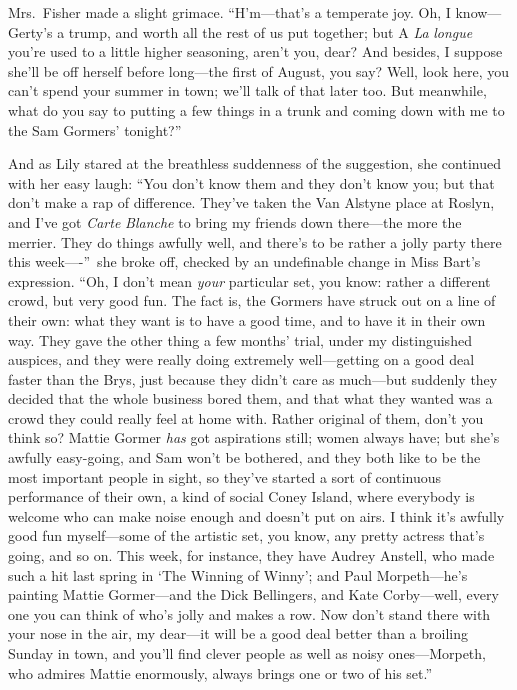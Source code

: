 \documentclass[12pt,a4paper]{book}
\begin{document}
Mrs.\ Fisher made a slight grimace. ``H'm---that's a temperate joy. 
Oh, I know---Gerty's a trump, and worth all the rest of us put
together; but A \textit{La} \textit{longue} you're used to a little higher
seasoning, aren't you, dear? And besides, I suppose she'll be off
herself before long---the first of August, you say? Well,
look here, you can't spend your summer in town; we'll talk of
that later too. But meanwhile, what do you say to putting a few
things in a trunk and coming down with me to the Sam Gormers'
tonight?''





And as Lily stared at the breathless suddenness of the
suggestion, she continued with her easy laugh: ``You don't know
them and they don't know you; but that don't make a rap of
difference. They've taken the Van Alstyne place at Roslyn, and
I've got \textit{Carte} \textit{Blanche} to bring my friends down there---the more
the merrier. They do things awfully well, and there's to be
rather a jolly party there this week----''\ she broke off, checked
by an undefinable change in Miss Bart's expression. ``Oh, I don't
mean \textit{your} particular set, you know: rather a different crowd, but
very good fun. The fact is, the Gormers have struck out on a line
of their own: what they want is to have a good time, and to have
it in their own way. They gave the other thing a few months'
trial, under my distinguished auspices, and they were really
doing extremely well---getting on a good deal faster than the
Brys, just because they didn't care as much---but suddenly they
decided that the whole business bored them, and that what they
wanted was a crowd they could really feel at home with. Rather
original of them, don't you think so? Mattie Gormer \textit{has} got
aspirations still; women always have; but she's awfully
easy-going, and Sam won't be bothered, and they both like to be
the most important people in sight, so they've started a sort of
continuous performance of their own, a kind of social Coney
Island, where everybody is welcome who can make noise enough and
doesn't put on airs. I think it's awfully good fun myself---some
of the artistic set, you know, any pretty actress that's going,
and so on. This week, for instance, they have Audrey Anstell, who
made such a hit last spring in `The Winning of Winny'; and Paul
Morpeth---he's painting Mattie Gormer---and the Dick Bellingers,
and Kate Corby---well, every one you can think of who's jolly and
makes a row. Now don't stand there with your nose in the air, my
dear---it will be a good deal better than a broiling Sunday in
town, and you'll find clever people as well as noisy
ones---Morpeth, who admires Mattie enormously, always brings one
or two of his set.''
\end{document}
